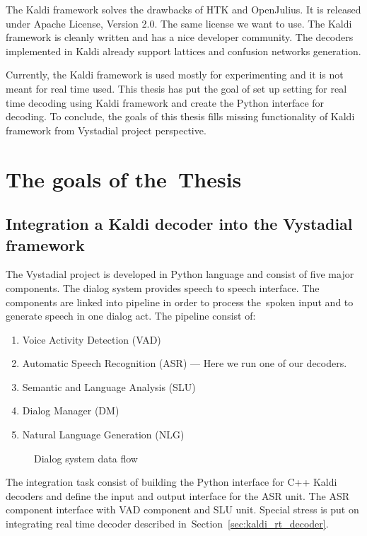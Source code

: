 The Kaldi framework solves the drawbacks of HTK and OpenJulius. It is released under Apache License, Version 2.0. The same license we want to use. The Kaldi framework is cleanly written and has a nice developer community.
The decoders implemented in Kaldi already support lattices and confusion networks generation. 


Currently, the Kaldi framework is used mostly for experimenting and it is not meant for real time used.
This thesis has put the goal of set up setting for real time decoding using Kaldi framework and create the Python interface for decoding. To conclude, the goals of this thesis fills missing functionality of Kaldi framework from Vystadial project perspective. 


\section{The goals of the~Thesis} 
\label{sec:goals}


\subsection{Integration a Kaldi decoder into the Vystadial framework} 
\label{sub:integration}
The Vystadial project is developed in Python language and consist of five major components. 
The dialog system provides speech to speech interface. The components are linked into pipeline in order to process the~spoken input and to generate speech in one dialog act.
The pipeline consist of:
\begin{enumerate}
    \item Voice Activity Detection (VAD)
    \item Automatic Speech Recognition (ASR) --- Here we run one of our decoders.
    \item Semantic and Language Analysis (SLU)
    \item Dialog Manager (DM)
    \item Natural Language Generation (NLG)
\end{enumerate}

\begin{figure}
    \begin{center}
    
    \caption{Dialog system data flow}
    \label{pic:dialog_system} 
    \end{center}
\end{figure}
The integration task consist of building the Python interface for C++ Kaldi decoders and define the input and output interface for the ASR unit. The ASR component interface with VAD component and SLU unit. Special stress is put on integrating real time decoder described in~Section~\ref{sec:kaldi_rt_decoder}.

